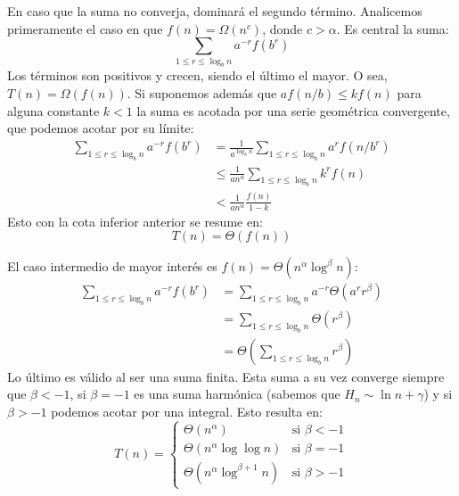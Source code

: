   En caso que la suma no converja,
  dominará el segundo término.
  Analicemos primeramente el caso en que \(f(n) = \Omega(n^c)\),
  donde \(c > \alpha\).
  Es central la suma:
  \begin{equation*}
    \sum_{1 \le r \le \log_b n} a^{-r} f(b^r)
  \end{equation*}
  Los términos son positivos y crecen,
  siendo el último el mayor.
  O sea,
  \(T(n) = \Omega(f(n))\).
  Si suponemos además que \(a f(n / b) \le k f(n)\)
  para alguna constante \(k < 1\)
  la suma es acotada por una serie geométrica convergente,
  que podemos acotar por su límite:
  \begin{align*}
    \sum_{1 \le r \le \log_b n} a^{-r} f(b^r)
      &=   \frac{1}{a^{\log_b n}} \sum_{1 \le r \le \log_b n} a^r f(n / b^r) \\
      &\le \frac{1}{a n^\alpha} \sum_{1 \le r \le \log_b n} k^r f(n) \\
      &<   \frac{1}{a n^\alpha} \frac{f(n)}{1 - k}
  \end{align*}
  Esto con la cota inferior anterior se resume en:
  \begin{equation*}
    T(n)
      = \Theta(f(n))
  \end{equation*}

  El caso intermedio de mayor interés es
  \(f(n) = \Theta(n^\alpha \log^\beta n)\):
  \begin{align*}
    \sum_{1 \le r \le \log_b n} a^{-r} f(b^r)
      &= \sum_{1 \le r \le \log_b n} a^{-r} \Theta(a^r r^\beta) \\
      &= \sum_{1 \le r \le \log_b n} \Theta(r^\beta) \\
      &= \Theta \left(
                  \sum_{1 \le r \le \log_b n} r^\beta
                \right)
  \end{align*}
  Lo último es válido al ser una suma finita.
  Esta suma a su vez converge siempre que \(\beta < -1\),
  si \(\beta = -1\) es una suma harmónica
  (sabemos que \(H_n \sim \ln n + \gamma\))
  y si \(\beta > -1\) podemos acotar por una integral.
  Esto resulta en:
  \begin{equation*}
    T(n)
      = \begin{cases}
          \Theta(n^\alpha)		      & \text{si \(\beta < -1\)} \\
          \Theta(n^\alpha \log \log n)	      & \text{si \(\beta = -1\)} \\
          \Theta(n^\alpha \log^{\beta + 1} n) & \text{si \(\beta > -1\)}
        \end{cases}
  \end{equation*}

